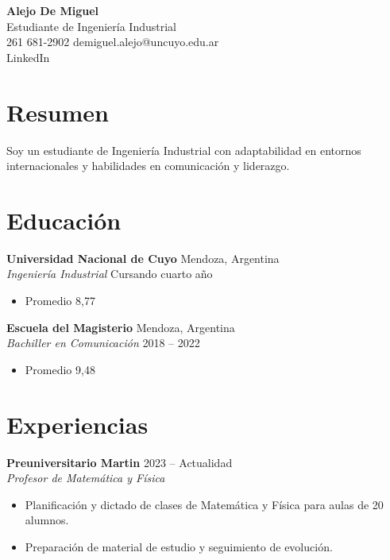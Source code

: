 \documentclass[11pt,a4paper,sans]{article}
\begin{document}
\begin{center}
    {\Huge \textbf{Alejo De Miguel}} %
    \\ \vspace{5pt}
    Estudiante de Ingeniería Industrial %
    \\ \vspace{2pt}
    261 681-2902 %
    demiguel.alejo@uncuyo.edu.ar %
    \\ \vspace{2pt}
    LinkedIn %
\end{center}

\section{Resumen}
Soy un estudiante de Ingeniería Industrial con adaptabilidad en entornos internacionales y habilidades en comunicación y liderazgo. %

\section{Educación}
\textbf{Universidad Nacional de Cuyo} \hfill Mendoza, Argentina %
\\ \textit{Ingeniería Industrial} \hfill Cursando cuarto año %
\begin{itemize}
    \item Promedio 8,77 %
\end{itemize}

\vspace{5pt}

\textbf{Escuela del Magisterio} \hfill Mendoza, Argentina %
\\ \textit{Bachiller en Comunicación} \hfill 2018 -- 2022 %
\begin{itemize}
    \item Promedio 9,48 %
\end{itemize}

\section{Experiencias}
\textbf{Preuniversitario Martin} \hfill 2023 -- Actualidad %
\\ \textit{Profesor de Matemática y Física} %
\begin{itemize}
    \item Planificación y dictado de clases de Matemática y Física para aulas de 20 alumnos. %
    \item Preparación de material de estudio y seguimiento de evolución. %
\end{itemize}
\end{document}

